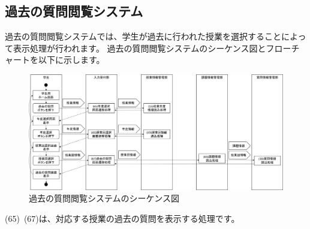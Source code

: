 \clearpage



\subsection{過去の質問閲覧システム}
過去の質問閲覧システムでは、学生が過去に行われた授業を選択することによって表示処理が行われます。
過去の質問閲覧システムのシーケンス図とフローチャートを以下に示します。

\begin{figure}[htbp]
  \begin{center}
    \includegraphics[width=1\linewidth,clip]{./img/seq17.png}
    \caption{過去の質問閲覧システムのシーケンス図}\label{fig:seq17}
  \end{center}
\end{figure}

(65)~(67)は、対応する授業の過去の質問を表示する処理です。

